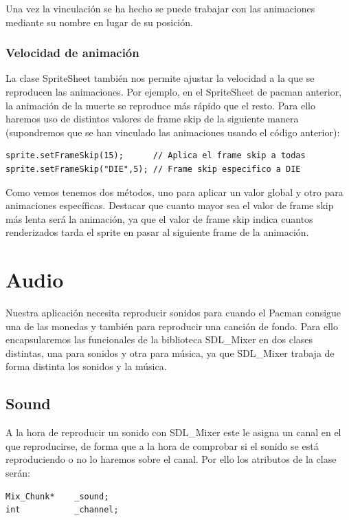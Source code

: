 \documentclass[parskip=half*]{scrartcl}
\begin{document}
			Una vez la vinculaci\'on se ha hecho se puede trabajar con las animaciones mediante su nombre en lugar de su posici\'on.

		\subsubsection{Velocidad de animaci\'on}

			La clase SpriteSheet tambi\'en nos permite ajustar la velocidad a la que se reproducen las animaciones. Por ejemplo, en el SpriteSheet de pacman anterior, la animaci\'on de la muerte se reproduce m\'as r\'apido que el resto. Para ello haremos uso de distintos valores de frame skip de la siguiente manera (supondremos que se han vinculado las animaciones usando el c\'odigo anterior):
			\begin{verbatim}
sprite.setFrameSkip(15);      // Aplica el frame skip a todas
sprite.setFrameSkip("DIE",5); // Frame skip especifico a DIE
			\end{verbatim}

			Como vemos tenemos dos m\'etodos, uno para aplicar un valor global y otro para animaciones espec\'ificas. Destacar que cuanto mayor sea el valor de frame skip m\'as lenta ser\'a la animaci\'on, ya que el valor de frame skip indica cuantos renderizados tarda el sprite en pasar al siguiente frame de la animaci\'on.

\newpage
\section{Audio}
	Nuestra aplicaci\'on necesita reproducir sonidos para cuando el Pacman consigue una de las monedas y tambi\'en para reproducir una canci\'on de fondo. Para ello encapsularemos las funcionales de la biblioteca SDL\_Mixer en dos clases distintas, una para sonidos y otra para m\'usica, ya que SDL\_Mixer trabaja de forma distinta los sonidos y la m\'usica.
	\subsection{Sound}
		A la hora de reproducir un sonido con SDL\_Mixer este le asigna un canal en el que reproducirse, de forma que a la hora de comprobar si el sonido se est\'a reproduciendo o no lo haremos sobre el canal. Por ello los atributos de la clase ser\'an:
		\begin{verbatim}
Mix_Chunk*    _sound;
int           _channel;
		\end{verbatim}
\end{document}
